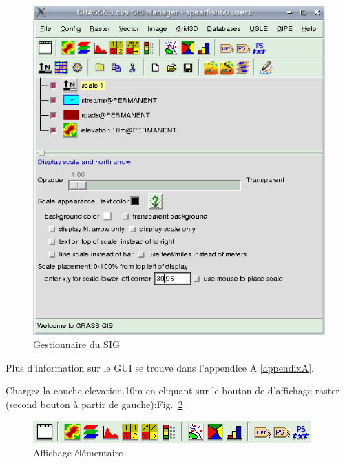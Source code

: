 \begin{figure}[htbp]
   \centering
   \includegraphics[scale=0.35]{grass002.png}
   \caption{Gestionnaire du SIG}
   \label{fig:grass002}
\end{figure}

Plus d'information sur le GUI se trouve dans l'appendice A \ref{appendixA}.

Chargez la couche elevation.10m en cliquant sur le bouton de d'affichage raster (second bouton \`a partir de gauche):Fig.~\ref{fig:grass003}

\begin{figure}[htbp]
   \centering
   \includegraphics[scale=0.5]{grass003.png}
   \caption{Affichage \'el\'ementaire}
   \label{fig:grass003}
\end{figure}

